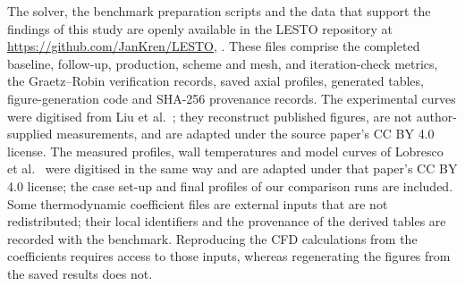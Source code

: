 The solver, the benchmark preparation scripts and the data that support
the findings of this study are openly available in the LESTO repository
at \url{https://github.com/JanKren/LESTO},
. These files comprise the completed baseline,
follow-up, production, scheme and mesh, and iteration-check metrics,
the Graetz--Robin verification records, saved axial profiles,
generated tables,
figure-generation code and SHA-256 provenance records. The experimental
curves were digitised from Liu et al.\ \cite{Liu2025chemical}; they
reconstruct published figures, are not author-supplied measurements,
and are adapted under the source paper's CC BY 4.0 license. The
measured profiles, wall temperatures and model curves of Lobresco et
al.\ \cite{Lobresco2026assessment} were digitised in the same way and
are adapted under that paper's CC BY 4.0 license; the case set-up and
final profiles of our comparison runs are included. Some
thermodynamic coefficient files are external inputs that are not
redistributed; their local identifiers and the provenance of the derived
tables are recorded with the benchmark. Reproducing the CFD calculations
from the coefficients requires access to those inputs, whereas
regenerating the figures from the saved results does not.
